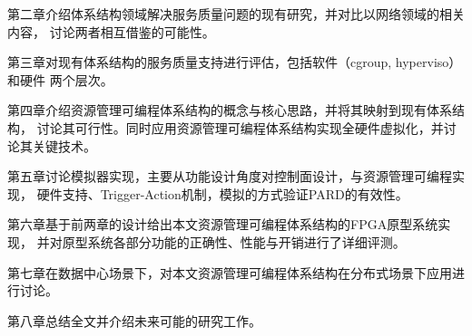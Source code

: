 第二章介绍体系结构领域解决服务质量问题的现有研究，并对比以网络领域的相关内容，
讨论两者相互借鉴的可能性。

第三章对现有体系结构的服务质量支持进行评估，包括软件（cgroup, hyperviso）和硬件
两个层次。

第四章介绍资源管理可编程体系结构的概念与核心思路，并将其映射到现有体系结构，
讨论其可行性。同时应用资源管理可编程体系结构实现全硬件虚拟化，并讨论其关键技术。

第五章讨论模拟器实现，主要从功能设计角度对控制面设计，与资源管理可编程实现，
硬件支持、Trigger-Action机制，模拟的方式验证PARD的有效性。

第六章基于前两章的设计给出本文资源管理可编程体系结构的FPGA原型系统实现，
并对原型系统各部分功能的正确性、性能与开销进行了详细评测。

第七章在数据中心场景下，对本文资源管理可编程体系结构在分布式场景下应用进行讨论。

第八章总结全文并介绍未来可能的研究工作。
